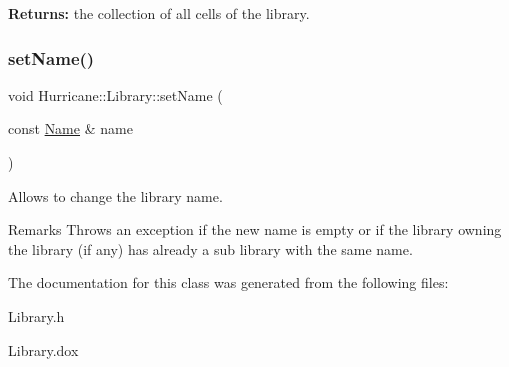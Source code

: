 {\bfseries Returns\+:} the collection of all cells of the library. \mbox{\label{classHurricane_1_1Library_a1181e4e87f42749bdfda253cad658ea9}} 
\subsubsection{\texorpdfstring{set\+Name()}{setName()}}
{\footnotesize\ttfamily void Hurricane\+::\+Library\+::set\+Name (\begin{DoxyParamCaption}\item[{const \mbox{\hyperlink{classHurricane_1_1Name}{Name}} \&}]{name }\end{DoxyParamCaption})}

Allows to change the library name.

\begin{DoxyRemark}{Remarks}
Throws an exception if the new name is empty or if the library owning the library (if any) has already a sub library with the same name. 
\end{DoxyRemark}


The documentation for this class was generated from the following files\+:\begin{DoxyCompactItemize}
\item 
Library.\+h\item 
Library.\+dox\end{DoxyCompactItemize}
